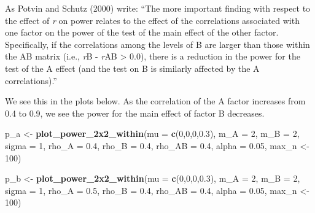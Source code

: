 \documentclass[]{article}
\newenvironment{Shaded}{\begin{snugshade}}{\end{snugshade}}
\newcommand{\KeywordTok}[1]{\textcolor[rgb]{0.13,0.29,0.53}{\textbf{#1}}}
\newcommand{\DataTypeTok}[1]{\textcolor[rgb]{0.13,0.29,0.53}{#1}}
\newcommand{\DecValTok}[1]{\textcolor[rgb]{0.00,0.00,0.81}{#1}}
\newcommand{\FloatTok}[1]{\textcolor[rgb]{0.00,0.00,0.81}{#1}}
\newcommand{\StringTok}[1]{\textcolor[rgb]{0.31,0.60,0.02}{#1}}
\newcommand{\NormalTok}[1]{#1}
\begin{document}
As Potvin and Schutz (2000) write: ``The more important finding with
respect to the effect of \emph{r} on power relates to the effect of the
correlations associated with one factor on the power of the test of the
main effect of the other factor. Specifically, if the correlations among
the levels of B are larger than those within the AB matrix (i.e.,
\emph{r}B - \emph{r}AB \textgreater{} 0.0), there is a reduction in the
power for the test of the A effect (and the test on B is similarly
affected by the A correlations).''

We see this in the plots below. As the correlation of the A factor
increases from 0.4 to 0.9, we see the power for the main effect of
factor B decreases.

\begin{Shaded}
\begin{Highlighting}[]
\NormalTok{p_a <-}\StringTok{ }\KeywordTok{plot_power_2x2_within}\NormalTok{(}\DataTypeTok{mu =} \KeywordTok{c}\NormalTok{(}\DecValTok{0}\NormalTok{,}\DecValTok{0}\NormalTok{,}\DecValTok{0}\NormalTok{,}\FloatTok{0.3}\NormalTok{), }
                      \DataTypeTok{m_A =} \DecValTok{2}\NormalTok{, }
                      \DataTypeTok{m_B =} \DecValTok{2}\NormalTok{, }
                      \DataTypeTok{sigma =} \DecValTok{1}\NormalTok{, }
                      \DataTypeTok{rho_A =} \FloatTok{0.4}\NormalTok{, }
                      \DataTypeTok{rho_B =} \FloatTok{0.4}\NormalTok{, }
                      \DataTypeTok{rho_AB =} \FloatTok{0.4}\NormalTok{, }
                      \DataTypeTok{alpha =} \FloatTok{0.05}\NormalTok{,}
\NormalTok{                      max_n <-}\StringTok{ }\DecValTok{100}\NormalTok{)}

\NormalTok{p_b <-}\StringTok{ }\KeywordTok{plot_power_2x2_within}\NormalTok{(}\DataTypeTok{mu =} \KeywordTok{c}\NormalTok{(}\DecValTok{0}\NormalTok{,}\DecValTok{0}\NormalTok{,}\DecValTok{0}\NormalTok{,}\FloatTok{0.3}\NormalTok{), }
                      \DataTypeTok{m_A =} \DecValTok{2}\NormalTok{, }
                      \DataTypeTok{m_B =} \DecValTok{2}\NormalTok{, }
                      \DataTypeTok{sigma =} \DecValTok{1}\NormalTok{, }
                      \DataTypeTok{rho_A =} \FloatTok{0.5}\NormalTok{, }
                      \DataTypeTok{rho_B =} \FloatTok{0.4}\NormalTok{, }
                      \DataTypeTok{rho_AB =} \FloatTok{0.4}\NormalTok{, }
                      \DataTypeTok{alpha =} \FloatTok{0.05}\NormalTok{,}
\NormalTok{                      max_n <-}\StringTok{ }\DecValTok{100}\NormalTok{)}


\end{Highlighting}
\end{Shaded}
\end{document}
